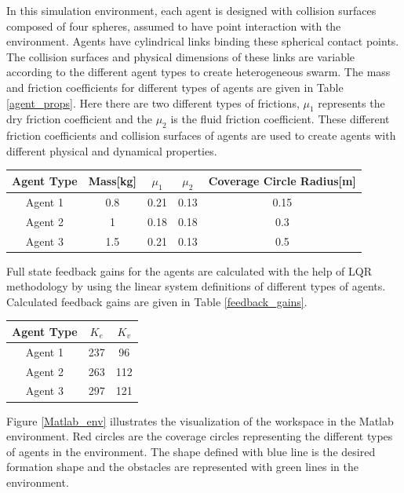 In this simulation environment, each agent is designed with collision surfaces composed of four spheres, assumed to have point interaction with the environment. Agents have cylindrical links binding these spherical contact points. The collision surfaces and physical dimensions of these links are variable according to the different agent types to create heterogeneous swarm. The mass and friction coefficients for different types of agents are given in Table \ref{agent_props}. Here there are two different types of frictions, $\mu_1$ represents the dry friction coefficient and the $\mu_2$ is the fluid friction coefficient. These different friction coefficients and collision surfaces of agents are used to create agents with different physical and dynamical properties.

\begin{center}
 \label{agent_props} 
\begin{tabular}{||c| c| c |c |c||}
				
\hline
Agent Type & Mass[kg]  & \textbf{$\mu_1$} & \textbf{$\mu_2$} & Coverage Circle Radius[m] \\ 
\hline
Agent 1& 0.8 & 0.21  & 0.13 & 0.15\\
Agent 2& 1   &  0.18 & 0.18 & 0.3\\	
Agent 3& 1.5 &  0.21 & 0.13 & 0.5\\	
\hline
\end{tabular}
\end{center}

Full state feedback gains for the agents are calculated with the help of LQR methodology by using the linear system definitions of different types of agents. Calculated feedback gains are given in Table \ref{feedback_gains}.

\begin{center}
 \label{feedback_gains} 
\begin{tabular}{||c| c |c||}
				
\hline
Agent Type & \textbf{$K_e$}  & \textbf{$K_v$} \\ 
\hline
Agent 1& 237 & 96\\
Agent 2& 263 & 112\\
Agent 3& 297 & 121\\
\hline
\end{tabular}
\end{center}

Figure \ref{Matlab_env} illustrates the visualization of the workspace in the Matlab environment. Red circles are the coverage circles representing the different types of agents in the environment. The shape defined with blue line is the desired formation shape and the obstacles are represented with green lines in the environment. 

